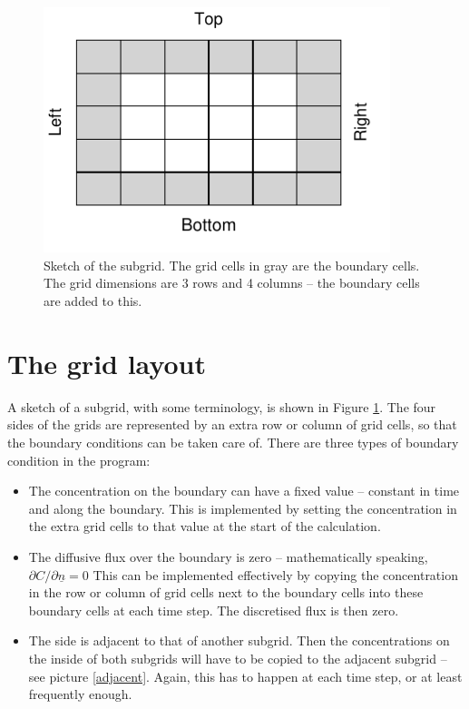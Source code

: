\documentclass[onecolumn]{article}
\begin{document}
\begin{figure}[H]
\caption{Sketch of the subgrid. The grid cells in gray are the boundary cells. The grid dimensions are 3 rows and 4 columns
-- the boundary cells are added to this.}
\label{subgrid}
\begin{center}
\includegraphics[width=0.9\textwidth]{diagram_subgrid.pdf}
\end{center}
\end{figure}


\section{The grid layout}
A sketch of a subgrid, with some terminology, is shown in Figure \ref{subgrid}. The four sides of the grids are
represented by an extra row or column of grid cells, so that the boundary conditions can be taken care of. There are
three types of boundary condition in the program:
\begin{itemize}
\item
The concentration on the boundary can have a fixed value -- constant in time and along the boundary.
This is implemented by setting the concentration in the extra grid cells to that value at the start of the calculation.
\item
The diffusive flux over the boundary is zero -- mathematically speaking, $\partial C / \partial \underline{n} = 0$
This can be implemented effectively by copying the concentration in the row or column of grid cells next to the boundary cells
into these boundary cells at each time step. The discretised flux is then zero.
\item
The side is adjacent to that of another subgrid. Then the concentrations on the inside of both subgrids will have to be copied
to the adjacent subgrid -- see picture \ref{adjacent}. Again, this has to happen at each time step, or at least frequently enough.
\end{itemize}
\end{document}
